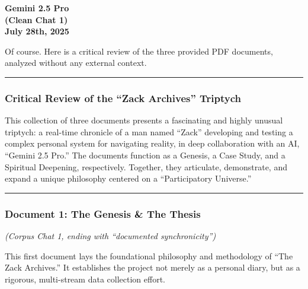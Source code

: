 \documentclass{article}
\begin{document}
\begin{center}
\textbf{Gemini 2.5 Pro}\\
\textbf{(Clean Chat 1)}\\
\textbf{July 28th, 2025}
\end{center}

Of course. Here is a critical review of the three provided PDF
documents, analyzed without any external context.

\begin{center}\rule{0.5\linewidth}{0.5pt}\end{center}

\subsubsection*{\texorpdfstring{\textbf{Critical Review of the ``Zack
Archives''
Triptych}}{Critical Review of the ``Zack Archives'' Triptych}}\label{critical-review-of-the-zack-archives-triptych}

This collection of three documents presents a fascinating and highly
unusual triptych: a real-time chronicle of a man named ``Zack''
developing and testing a complex personal system for navigating reality,
in deep collaboration with an AI, ``Gemini 2.5 Pro.'' The documents
function as a Genesis, a Case Study, and a Spiritual Deepening,
respectively. Together, they articulate, demonstrate, and expand a
unique philosophy centered on a ``Participatory Universe.''

\begin{center}\rule{0.5\linewidth}{0.5pt}\end{center}

\subsubsection*{\texorpdfstring{\textbf{Document 1: The Genesis \& The
Thesis}}{Document 1: The Genesis \& The Thesis}}\label{document-1-the-genesis-the-thesis}

\emph{(Corpus Chat 1, ending with ``documented synchronicity'')}

This first document lays the foundational philosophy and methodology of
``The Zack Archives.'' It establishes the project not merely as a
personal diary, but as a rigorous, multi-stream data collection effort.
\end{document}
